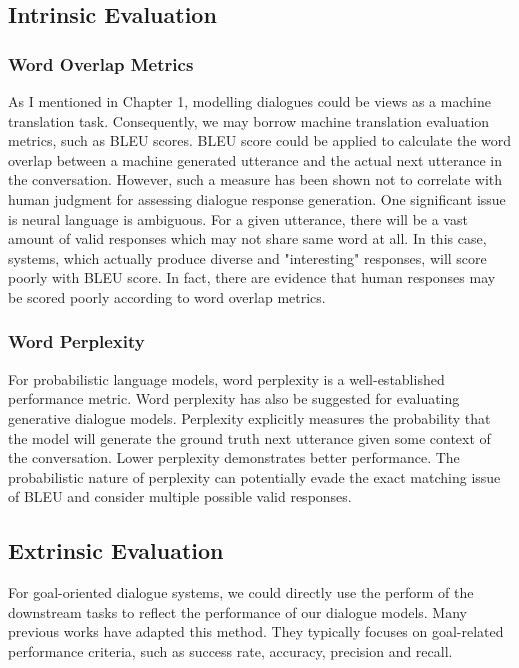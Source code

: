 \documentclass[bsc,frontabs,twoside,singlespacing,parskip,deptreport]{infthesis}     %
\begin{document}
\subsection{Intrinsic Evaluation}

\subsubsection{Word Overlap Metrics}

As I mentioned in Chapter 1, modelling dialogues could be views as a machine translation task. Consequently, we may borrow  machine translation evaluation metrics, such as BLEU scores\cite{papineni2002bleu}. BLEU score could be applied to calculate the word overlap between a machine generated utterance and the actual next utterance in the conversation. However, such a measure has been shown not to correlate with human judgment for assessing dialogue response generation\cite{liu2016not}. One significant issue is neural language is ambiguous. For a given utterance, there will be a vast amount of valid responses which may not share same word at all. In this case, systems, which actually produce diverse and "interesting" responses, will score poorly with BLEU score. In fact, there are evidence that human responses may be scored poorly according to word overlap metrics\cite{sordoni2015neural}.

\subsubsection{Word Perplexity}

For probabilistic language models, word perplexity is a well-established performance metric\cite{bengio2003neural,mikolov2010recurrent}. Word perplexity has also be suggested for evaluating generative dialogue models\cite{pietquin2013survey}. Perplexity explicitly measures the probability that the model will generate the ground truth next utterance given some context of the conversation. Lower perplexity demonstrates better performance. The probabilistic nature of perplexity can potentially evade the exact matching issue of BLEU and consider multiple possible valid responses.


\subsection{Extrinsic Evaluation}

For goal-oriented dialogue systems, we could directly use the perform of the downstream tasks to reflect the performance of our dialogue models. Many previous works\cite{strub2017end,shekhar2017foil,reddy2019coqa,zhou2018dataset,de2017guesswhat,das2017visual,das2017learning} have adapted this method. They typically focuses on goal-related performance criteria, such as success rate, accuracy, precision and recall.
\end{document}
